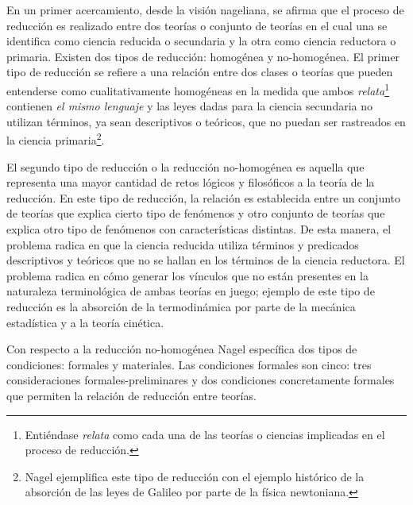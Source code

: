 \documentclass[]{book}
\begin{document}
En un primer acercamiento, desde la visión nageliana, se afirma que el
proceso de reducción es realizado entre dos teorías o conjunto de
teorías en el cual una se identifica como ciencia reducida o secundaria
y la otra como ciencia reductora o primaria. Existen dos tipos de
reducción: homogénea y no-homogénea. El primer tipo de reducción se
refiere a una relación entre dos clases o teorías que pueden entenderse
como cualitativamente homogéneas en la medida que ambos
\emph{relata}\footnote{Entiéndase \emph{relata} como cada una de las
  teorías o ciencias implicadas en el proceso de reducción.} contienen
\emph{el mismo lenguaje} y las leyes dadas para la ciencia secundaria no
utilizan términos, ya sean descriptivos o teóricos, que no puedan ser
rastreados en la ciencia primaria\footnote{Nagel ejemplifica este tipo
  de reducción con el ejemplo histórico de la absorción de las leyes de
  Galileo por parte de la física newtoniana.}.

El segundo tipo de reducción o la reducción no-homogénea es aquella que
representa una mayor cantidad de retos lógicos y filosóficos a la teoría
de la reducción. En este tipo de reducción, la relación es establecida
entre un conjunto de teorías que explica cierto tipo de fenómenos y otro
conjunto de teorías que explica otro tipo de fenómenos con
características distintas. De esta manera, el problema radica en que la
ciencia reducida utiliza términos y predicados descriptivos y teóricos
que no se hallan en los términos de la ciencia reductora. El problema
radica en cómo generar los vínculos que no están presentes en la
naturaleza terminológica de ambas teorías en juego; ejemplo de este tipo
de reducción es la absorción de la termodinámica por parte de la
mecánica estadística y a la teoría cinética.

Con respecto a la reducción no-homogénea Nagel específica dos tipos de
condiciones: formales y materiales. Las condiciones formales son cinco:
tres consideraciones formales-preliminares y dos condiciones
concretamente formales que permiten la relación de reducción entre
teorías.
\end{document}

